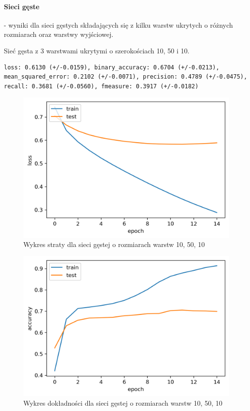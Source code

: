 \documentclass[polish,12pt]{aghthesis}
\begin{document}
\paragraph{Sieci gęste} - wyniki dla sieci gęstych składających się z kilku warstw ukrytych o różnych rozmiarach oraz warstwy wyjściowej.

Sieć gęsta z 3 warstwami ukrytymi o szerokościach 10, 50 i 10.

\begin{lstlisting}[float=h!, style=result, caption={Wyniki sieci gęstej o rozmiarach warstw 10, 50, 10}]
loss: 0.6130 (+/-0.0159), binary_accuracy: 0.6704 (+/-0.0213), mean_squared_error: 0.2102 (+/-0.0071), precision: 0.4789 (+/-0.0475), recall: 0.3681 (+/-0.0560), fmeasure: 0.3917 (+/-0.0182)
\end{lstlisting}

\begin{figure}[H]
	\centering
	\includegraphics[width=0.7\linewidth]{dense_10_50_10_loss.png}
	\caption{Wykres straty dla sieci gęstej o rozmiarach warstw 10, 50, 10}
	\label{fig:dense_10_50_10_loss}
\end{figure}
\begin{figure}[H]
	\centering
	\includegraphics[width=0.7\linewidth]{dense_10_50_10_acc.png}
	\caption{Wykres dokładności dla sieci gęstej o rozmiarach warstw 10, 50, 10}
	\label{fig:dense_10_50_10_acc}
\end{figure}
\end{document}
